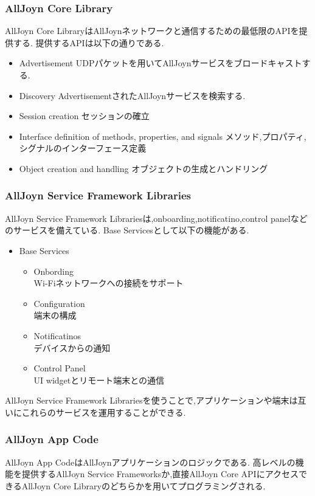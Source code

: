 \subsubsection{AllJoyn Core Library}
AllJoyn Core LibraryはAllJoynネットワークと通信するための最低限のAPIを提供する.
提供するAPIは以下の通りである.

\begin{itemize}
\item Advertisement
UDPパケットを用いてAllJoynサービスをブロードキャストする.
\item Discovery
AdvertisementされたAllJoynサービスを検索する.
\item Session creation
セッションの確立
\item Interface definition of methods, properties, and signals
メソッド,プロパティ,シグナルのインターフェース定義
\item Object creation and handling
オブジェクトの生成とハンドリング
\end{itemize}

\subsubsection{AllJoyn Service Framework Libraries}
AllJoyn Service Framework Librariesは,onboarding,notificatino,control panelなどのサービスを備えている.
Base Servicesとして以下の機能がある.

\begin{itemize}
\item Base Services
\begin{itemize}
\item Onbording \\
Wi-Fiネットワークへの接続をサポート
\item Configuration \\
端末の構成
\item Notificatinos \\
デバイスからの通知
\item Control Panel \\
UI widgetとリモート端末との通信
\end{itemize}
\end{itemize}

AllJoyn Service Framework Librariesを使うことで,アプリケーションや端末は互いにこれらのサービスを運用することができる.


\subsubsection{AllJoyn App Code}
AllJoyn App CodeはAllJoynアプリケーションのロジックである.
高レベルの機能を提供するAllJoyn Service Frameworksか,直接AllJoyn Core APIにアクセスできるAllJoyn Core Libraryのどちらかを用いてプログラミングされる.

